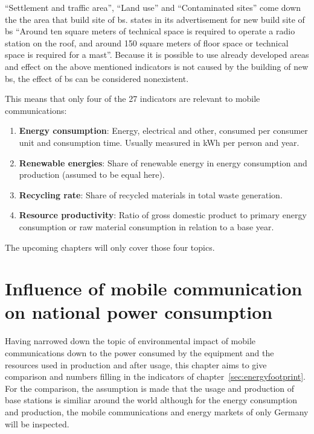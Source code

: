 \documentclass[11pt,a4paper]{article}
\begin{document}
\enquote{Settlement and traffic area}, \enquote{Land use} and \enquote{Contaminated sites} come down the the area that build site of  \acrshort{bs}.
\citep{BSStandort} states in its advertisement for new build site of \acrshort{bs} \enquote{Around ten square meters of technical space is required to operate a radio station on the roof, and around 150 square meters of floor space or technical space is required for a mast}.
Because it is possible to use already developed areas and effect on the above mentioned indicators is not caused by the building of new \acrshort{bs}, the effect of \acrshort{bs} can be considered nonexistent.

This means that only four of the 27 indicators are relevant to mobile communications:
\begin{enumerate}
  \item \textbf{Energy consumption}: Energy, electrical and other, consumed per consumer unit and consumption time. Usually measured in kWh per person and year.
  \item \textbf{Renewable energies}: Share of renewable energy in energy consumption and production (assumed to be equal here).
  \item \textbf{Recycling rate}: Share of recycled materials in total waste generation.
  \item \textbf{Resource productivity}: Ratio of gross domestic product to primary energy consumption or raw material consumption in relation to a base year.
\end{enumerate}

The upcoming chapters will only cover those four topics.

\section{Influence of mobile communication on national power consumption}\label{sec:influence}

Having narrowed down the topic of environmental impact of mobile communications down to the power consumed by the equipment and the resources used in production and after usage, this chapter aims to give comparison and numbers filling in the indicators of chapter~\ref{sec:energyfootprint}.
For the comparison, the assumption is made that the usage and production of base stations is similiar around the world although for the energy consumption and production, the mobile communications and energy markets of only Germany will be inspected. 
\end{document}
